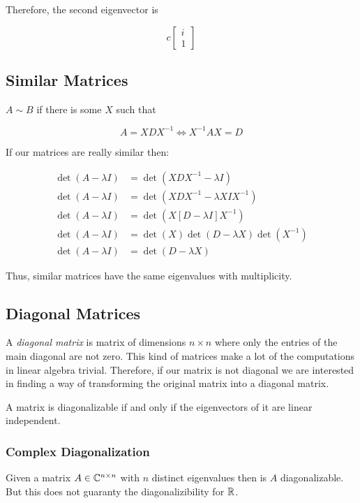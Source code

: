 Therefore, the second eigenvector is 

\[  
    c
    \begin{bmatrix}
        i \\
        1        
    \end{bmatrix}
\]

\subsection{Similar Matrices}

\(A \sim B\) if there is some \(X\) such that 

\[
    A = XDX^{-1} \iff X^{-1}AX = D
\]

If our matrices are really similar then:

\begin{align*}
    \det(A - \lambda I) &= \det(XDX^{-1} - \lambda I)\\
    \det(A - \lambda I) &= \det(XDX^{-1} - \lambda X I X^{-1})\\
    \det(A - \lambda I) &= \det(X[D - \lambda I] X^{-1})\\
    \det(A - \lambda I) &= \det(X)\det(D - \lambda X) \det(X^{-1})\\
    \det(A - \lambda I) &= \det(D - \lambda X) 
\end{align*}

Thus, similar matrices have the same eigenvalues with multiplicity.

\subsection{Diagonal Matrices}

A \emph{diagonal matrix} is matrix of dimensions \(n \times n\) where only the entries of the main diagonal 
are not zero. This kind of matrices make a lot of the computations in linear algebra trivial. Therefore, 
if our matrix is not diagonal we are interested in finding a way of transforming the original matrix 
into a diagonal matrix.

A matrix is diagonalizable if and only if the eigenvectors of it are linear independent.

\subsubsection{Complex Diagonalization}

Given a matrix \(A \in \mathbb{C}^{n \times n}\) with \(n\) distinct eigenvalues then is \(A\)
diagonalizable. But this does not guaranty the diagonalizibility for \(\mathbb{R}\).

